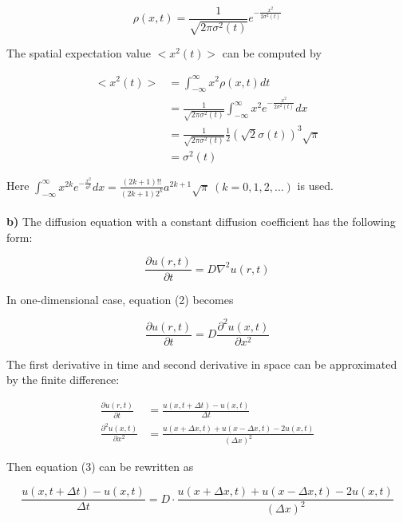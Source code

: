 \documentclass{article}
\begin{document}
\begin{equation}
\rho(x,t) = \frac{1}{\sqrt{2\pi \sigma^2 (t)}} e^{-\frac{x^2}{2\sigma^2(t)}}
\end{equation}

The spatial expectation value $<x^2(t)>$ can be computed by

\begin{align*}
<x^2(t)> & = \int_{-\infty}^{\infty} x^2 \rho(x,t) dt \\
& = \frac{1}{\sqrt{2\pi \sigma^2 (t)}} \int_{-\infty}^{\infty} x^2 e^{-\frac{x^2}{2\sigma^2(t)}} dx \\
& = \frac{1}{\sqrt{2\pi \sigma^2 (t)}} \frac{1}{2} (\sqrt{2} \sigma(t))^3 \sqrt{\pi} \\
& = \sigma^2 (t)
\end{align*}

Here $\int_{-\infty}^{\infty} x^{2k} e^{-\frac{x^2}{a^2}} dx = \frac{(2k+1)!!}{(2k+1)2^k} a^{2k+1} \sqrt{\pi}\ (k=0,1,2,...)$ is used.\\
\\
\textbf{b)} The diffusion equation with a constant diffusion coefficient has the following form:

\begin{equation}
\frac{\partial u (r,t)}{\partial t} = D \nabla^2 u(r,t)
\end{equation}

In one-dimensional case, equation (2) becomes

\begin{equation}
\frac{\partial u (r,t)}{\partial t} = D \frac{\partial^2 u(x,t)}{\partial x^2}
\end{equation}

The first derivative in time and second derivative in space can be approximated by the finite difference:

\begin{align*}
\frac{\partial u (r,t)}{\partial t} & = \frac{u(x,t+\Delta t) - u(x,t)}{\Delta t} \\
\frac{\partial^2 u(x,t)}{\partial x^2} & = \frac{u(x+\Delta x,t)+u(x-\Delta x,t)-2u(x,t)}{(\Delta x)^2}
\end{align*}

Then equation (3) can be rewritten as

\begin{equation*}
\frac{u(x,t+\Delta t) - u(x,t)}{\Delta t} = D \cdot \frac{u(x+\Delta x,t)+u(x-\Delta x,t)-2u(x,t)}{(\Delta x)^2}
\end{equation*}
\end{document}
